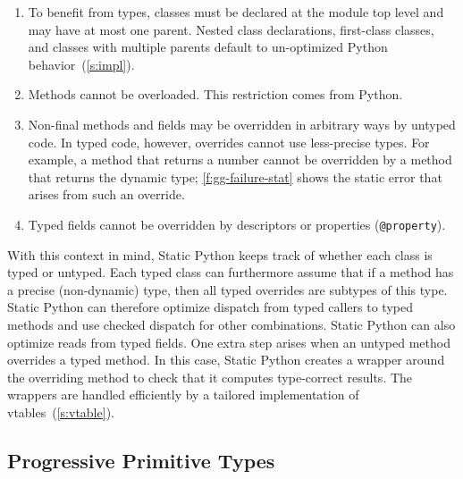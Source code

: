 \documentclass[english,cleveref,submission]{programming}
\newcommand{\SP}{Static Python}
\newcommand{\code}[1]{\texttt{#1}}
\begin{document}
\begin{enumerate}
  \item
    To benefit from types, classes must be declared at the module top level
    and may have at most one parent.
    Nested class declarations, first-class classes, and classes with
    multiple parents default to un-optimized Python behavior~(\cref{s:impl}).

  \item
    Methods cannot be overloaded.
    This restriction comes from Python.

  \item
    Non-final methods and fields may be overridden in arbitrary ways by untyped code.
    In typed code, however, overrides cannot use less-precise types.
    For example, a method that returns a number cannot be overridden by a method
    that returns the dynamic type; \cref{f:gg-failure-stat} shows the static error
    that arises from such an override.


  \item
    Typed fields cannot be overridden by descriptors or properties (\code{@property}).

\end{enumerate}
%
With this context in mind, \SP{} keeps track of whether each class is typed or untyped.
Each typed class can furthermore assume that if a method has a precise (non-dynamic)
type, then all typed overrides are subtypes of this type.
\SP{} can therefore optimize dispatch from typed callers to typed methods
and use checked dispatch for other combinations.
\SP{} can also optimize reads from typed fields.
One extra step arises when an untyped method overrides a typed method.
In this case, \SP{} creates a wrapper around the overriding method to check
that it computes type-correct results.
The wrappers are handled efficiently by a tailored implementation of vtables~(\cref{s:vtable}).


\subsection{Progressive Primitive Types}
\label{s:c-types}
\end{document}
